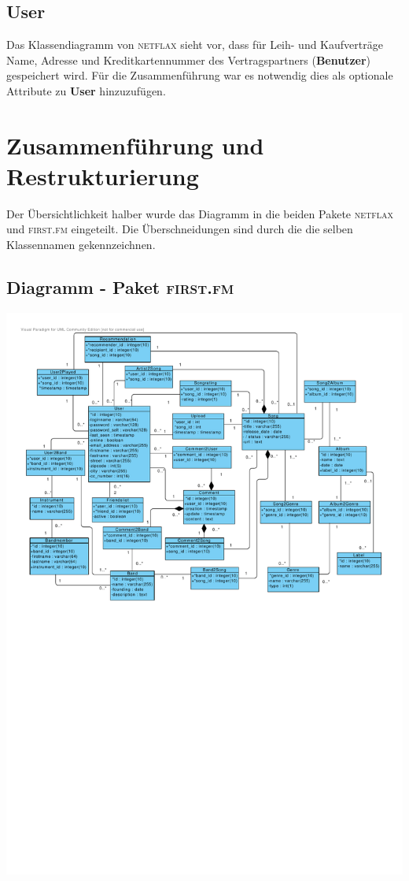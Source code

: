 \documentclass[11pt,a4paper,DIV=9]{scrartcl}
\begin{document}
  \subsection{User}
    Das Klassendiagramm von \textsc{netflax} sieht vor, dass für Leih- und Kaufverträge Name, Adresse und Kreditkartennummer des Vertragspartners (\textbf{Benutzer}) gespeichert wird. Für die Zusammenführung war es notwendig dies als optionale Attribute zu \textbf{User} hinzuzufügen.



\section{Zusammenführung und Restrukturierung}
  Der Übersichtlichkeit halber wurde das Diagramm in die beiden Pakete \textsc{netflax} und \textsc{first.fm} eingeteilt. Die Überschneidungen sind durch die die selben Klassennamen gekennzeichnen.

  \subsection{Diagramm - Paket \textsc{first.fm}}
    \includegraphics[angle=90,trim=1cm 0cm 1.1cm 1cm, clip=true, scale=0.99]{Diagramme/Paket_FirstFm}
\end{document}
